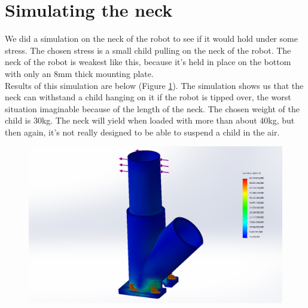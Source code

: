 \documentclass[11pt,twoside,a4paper]{report}
\begin{document}
\section{Simulating the neck}
We did a simulation on the neck of the robot to see if it would hold under some stress. The chosen stress is a small child pulling on the neck of the robot. The neck of the robot is weakest like this, because it’s held in place on the bottom with only an 8mm thick mounting plate.\\
Results of this simulation are below (Figure \ref{fig:simluation}). The simulation shows us that the neck can withstand a child hanging on it if the robot is tipped over, the worst situation imaginable because of the length of the neck. The chosen weight of the child is 30kg. The neck will yield when loaded with more than about 40kg, but then again, it’s not really designed to be able to suspend a child in the air.

\begin{figure}[!htb]
\begin{center}
\includegraphics[width=14cm]{Images/result_simulation.jpg}
\caption{ }
\label{fig:simluation}
\end{center}
\end{figure}
\label{sect:NeckSim}
\end{document}
